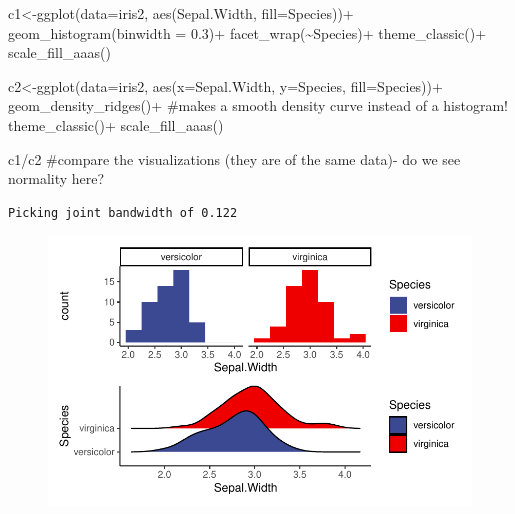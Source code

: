 \documentclass[
  letterpaper,
  DIV=11,
  numbers=noendperiod]{scrartcl}
\newenvironment{Shaded}{\begin{snugshade}}{\end{snugshade}}
\newcommand{\AttributeTok}[1]{\textcolor[rgb]{0.40,0.45,0.13}{#1}}
\newcommand{\CommentTok}[1]{\textcolor[rgb]{0.37,0.37,0.37}{#1}}
\newcommand{\FloatTok}[1]{\textcolor[rgb]{0.68,0.00,0.00}{#1}}
\newcommand{\FunctionTok}[1]{\textcolor[rgb]{0.28,0.35,0.67}{#1}}
\newcommand{\NormalTok}[1]{\textcolor[rgb]{0.00,0.23,0.31}{#1}}
\newcommand{\OtherTok}[1]{\textcolor[rgb]{0.00,0.23,0.31}{#1}}
\newcommand{\SpecialCharTok}[1]{\textcolor[rgb]{0.37,0.37,0.37}{#1}}
\begin{document}
\begin{Shaded}
\begin{Highlighting}[]
\NormalTok{c1}\OtherTok{\textless{}{-}}\FunctionTok{ggplot}\NormalTok{(}\AttributeTok{data=}\NormalTok{iris2, }\FunctionTok{aes}\NormalTok{(Sepal.Width, }\AttributeTok{fill=}\NormalTok{Species))}\SpecialCharTok{+}
  \FunctionTok{geom\_histogram}\NormalTok{(}\AttributeTok{binwidth =} \FloatTok{0.3}\NormalTok{)}\SpecialCharTok{+} 
  \FunctionTok{facet\_wrap}\NormalTok{(}\SpecialCharTok{\textasciitilde{}}\NormalTok{Species)}\SpecialCharTok{+}
  \FunctionTok{theme\_classic}\NormalTok{()}\SpecialCharTok{+}
  \FunctionTok{scale\_fill\_aaas}\NormalTok{()}

\NormalTok{c2}\OtherTok{\textless{}{-}}\FunctionTok{ggplot}\NormalTok{(}\AttributeTok{data=}\NormalTok{iris2, }\FunctionTok{aes}\NormalTok{(}\AttributeTok{x=}\NormalTok{Sepal.Width, }\AttributeTok{y=}\NormalTok{Species, }\AttributeTok{fill=}\NormalTok{Species))}\SpecialCharTok{+}
  \FunctionTok{geom\_density\_ridges}\NormalTok{()}\SpecialCharTok{+} \CommentTok{\#makes a smooth density curve instead of a histogram!}
  \FunctionTok{theme\_classic}\NormalTok{()}\SpecialCharTok{+}
  \FunctionTok{scale\_fill\_aaas}\NormalTok{()}

\NormalTok{c1}\SpecialCharTok{/}\NormalTok{c2 }\CommentTok{\#compare the visualizations (they are of the same data){-} do we see normality here?}
\end{Highlighting}
\end{Shaded}

\begin{verbatim}
Picking joint bandwidth of 0.122
\end{verbatim}

\begin{figure}[H]

{\centering \includegraphics{cor_reg_chi_files/figure-pdf/unnamed-chunk-25-1.pdf}

}

\end{figure}
\end{document}
